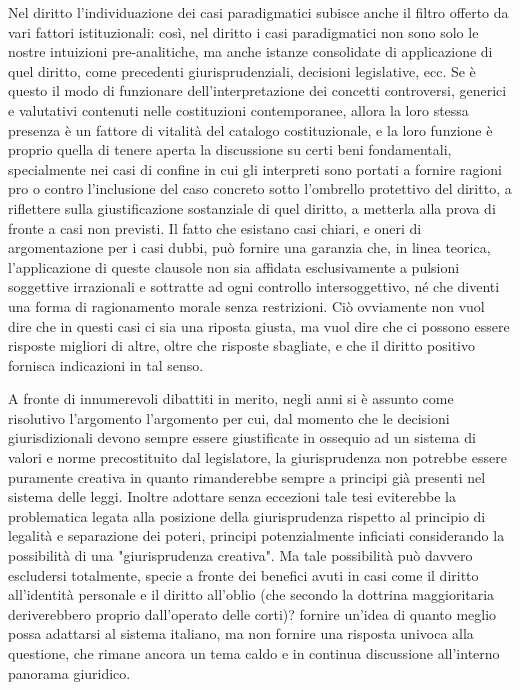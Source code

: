 Nel diritto l’individuazione dei casi paradigmatici subisce anche il filtro offerto da vari fattori istituzionali: così, nel diritto i casi paradigmatici non sono solo le nostre intuizioni pre-analitiche, ma anche istanze consolidate di applicazione di quel diritto, come precedenti giurisprudenziali, decisioni legislative, ecc. Se è questo il modo di funzionare dell’interpretazione dei concetti controversi, generici e valutativi contenuti nelle costituzioni contemporanee, allora la loro stessa presenza è un fattore di vitalità del catalogo costituzionale, e la loro funzione è proprio quella di tenere aperta la discussione su certi beni fondamentali, specialmente nei casi di confine in cui gli interpreti sono portati a fornire ragioni pro o contro l’inclusione del caso concreto sotto l’ombrello protettivo del diritto, a riflettere sulla giustificazione sostanziale di quel diritto, a metterla alla prova di fronte a casi non previsti.
Il fatto che esistano casi chiari, e oneri di argomentazione per i casi dubbi, può fornire una garanzia che, in linea teorica, l’applicazione di queste clausole non sia affidata esclusivamente a pulsioni soggettive irrazionali e sottratte ad ogni controllo intersoggettivo, né che diventi una forma di ragionamento morale senza restrizioni. Ciò ovviamente non vuol dire che in questi casi ci sia una riposta giusta, ma vuol dire che ci possono essere risposte migliori di altre, oltre che risposte sbagliate, e che il diritto positivo fornisca
indicazioni in tal senso.


A fronte di innumerevoli dibattiti in merito, negli anni si è assunto come risolutivo l’argomento l'argomento per cui, dal momento che le decisioni giurisdizionali devono sempre essere giustificate in ossequio ad un sistema di valori e norme precostituito dal legislatore, la giurisprudenza non potrebbe essere puramente creativa in quanto rimanderebbe sempre a principi già presenti nel sistema delle leggi. Inoltre adottare senza eccezioni tale tesi eviterebbe la problematica legata alla posizione della giurisprudenza rispetto al principio di legalità e separazione dei poteri, principi potenzialmente inficiati considerando la possibilità di una "giurisprudenza creativa".
Ma tale possibilità può davvero escludersi totalmente, specie a fronte dei benefici avuti in casi come il diritto all'identità personale e il diritto all'oblio (che secondo la dottrina maggioritaria deriverebbero proprio dall'operato delle corti)? 
 fornire un'idea di quanto meglio possa adattarsi al sistema italiano, ma non fornire una risposta univoca alla questione, che rimane ancora un tema caldo e in continua discussione all'interno panorama giuridico. 

